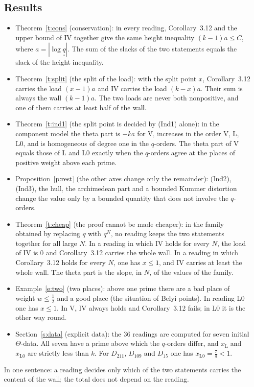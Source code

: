 \documentclass[11pt,a4paper]{article}
\newcommand{\qq}{\underline{\underline{q}}}
\newcommand{\rL}{\mathrm{L}}
\newcommand{\rLz}{\mathrm{L0}}
\theoremstyle{plain}
\theoremstyle{definition}
\theoremstyle{remark}
\begin{document}
\subsection{Results}
\begin{itemize}
\item Theorem~\ref{t:cons} (conservation): in every reading, Corollary~3.12 and the upper bound of IV together give the
same height inequality $(k-1)a\le C$, where $a=|\log\qq|$. The sum of the slacks of the two statements equals the slack
of the height inequality.
\item Theorem~\ref{t:split} (the split of the load): with the split point $x$, Corollary~3.12 carries the load
$(x-1)a$ and IV carries the load $(k-x)a$. Their sum is always the wall $(k-1)a$. The two loads are never both
nonpositive, and one of them carries at least half of the wall.
\item Theorem~\ref{t:ind1} (the split point is decided by (Ind1) alone): in the component model the theta part is
$-ka$ for V, increases in the order V, L, L0, and is homogeneous of degree one in the $q$-orders. The theta
part of V equals those of L and L0 exactly when the $q$-orders agree at the places of positive weight above each
prime.
\item Proposition~\ref{p:rest} (the other axes change only the remainder): (Ind2), (Ind3), the hull, the archimedean
part and a bounded Kummer distortion change the value only by a bounded quantity that does not involve the $q$-orders.
\item Theorem~\ref{t:cheap} (the proof cannot be made cheaper): in the family obtained by replacing $q$ with $q^N$, no
reading keeps the two statements together for all large $N$. In a reading in which IV holds for every $N$, the load of
IV is $0$ and Corollary~3.12 carries the whole wall. In a reading in which Corollary~3.12 holds for every $N$, one has
$x\le1$, and IV carries at least the whole wall. The theta part is the slope, in $N$, of the values of the family.
\item Example~\ref{e:two} (two places): above one prime there are a bad place of weight $w\le\frac12$ and a good place
(the situation of Belyi points). In reading L0 one has $x\le1$. In V, IV always holds and Corollary~3.12 fails; in L0
it is the other way round.
\item Section~\ref{s:data} (explicit data): the 36 readings are computed for seven initial $\Theta$-data. All seven
have a prime above which the $q$-orders differ, and $x_\rL$ and $x_\rLz$ are strictly less than $k$. For $D_{211}$,
$D_{109}$ and $D_{15}$ one has $x_\rLz=\frac78<1$.
\end{itemize}
In one sentence: a reading decides only which of the two statements carries the content of the wall; the total does
not depend on the reading.
\end{document}
